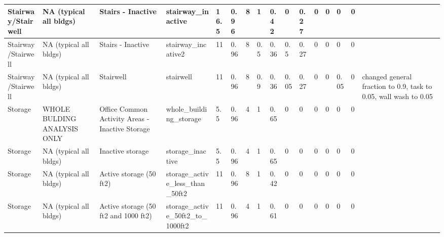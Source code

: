 \begin{center}
\begin{landscape}
\begin{longtable}{|p{0.75in}|p{0.75in}|p{0.75in}|p{0.75in}|p{0.3in}|p{0.3in}|p{0.3in}|p{0.3in}|p{0.3in}|p{0.3in}|p{0.3in}|p{0.3in}|p{0.3in}|p{0.3in}|p{0.3in}|p{0.6in}|}
      Stairway/Stairwell                    & NA (typical all bldgs)      & Stairs - Inactive                               & stairway\_inactive                                              & 16.5 & 0.96 & 8  & 1      & 0.42  & 0     & 0.27  & 0    & 0    & 0    & 0    &                                                                                       \\ \hline
      Stairway/Stairwell                    & NA (typical all bldgs)      & Stairs - Inactive                               & stairway\_incative2                                             & 11   & 0.96 & 8  & 0.5    & 0.36  & 0.5   & 0.27  & 0    & 0    & 0    & 0    &                                                                                       \\ \hline
      Stairway/Stairwell                    & NA (typical all bldgs)      & Stairwell                                       & stairwell                                                       & 11   & 0.96 & 8  & 0.9    & 0.36  & 0.05  & 0.27  & 0    & 0    & 0.05 & 0    & changed general fraction to 0.9, task to 0.05, wall wash to 0.05                      \\ \hline
      Storage                                 & WHOLE BULDING ANALYSIS ONLY & Office Common Activity Areas - Inactive Storage & whole\_building\_storage                                        & 5.5  & 0.96 & 4  & 1      & 0.65  & 0     & 0     & 0    & 0    & 0    & 0    &                                                                                       \\ \hline
      Storage                                 & NA (typical all bldgs)      & Inactive storage                                & storage\_inactive                                               & 5.5  & 0.96 & 4  & 1      & 0.65  & 0     & 0     & 0    & 0    & 0    & 0    &                                                                                       \\ \hline
      Storage                                 & NA (typical all bldgs)      & Active storage (50 ft2)                         & storage\_active\_less\_than\_50ft2                              & 11   & 0.96 & 8  & 1      & 0.42  & 0     & 0     & 0    & 0    & 0    & 0    &                                                                                       \\ \hline
      Storage                                 & NA (typical all bldgs)      & Active storage (50 ft2 and 1000 ft2)            & storage\_active\_50ft2\_to\_1000ft2                             & 11   & 0.96 & 4  & 1      & 0.61  & 0     & 0     & 0    & 0    & 0    & 0    &                                                                                       \\ \hline

\end{longtable}
\end{landscape}
\end{center}
